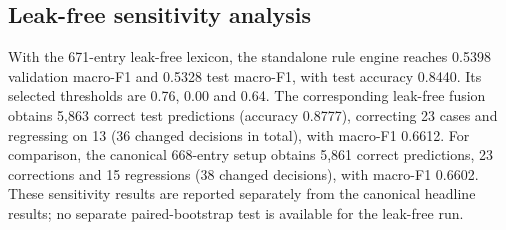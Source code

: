 \subsection{Leak-free sensitivity analysis}

\label{sec:leak-free-sensitivity}

With the 671-entry leak-free lexicon, the standalone rule engine reaches 0.5398
validation macro-F1 and 0.5328 test macro-F1, with test accuracy 0.8440. Its selected
thresholds are \hate{} 0.76, \off{} 0.00 and \clean{} 0.64. The corresponding
leak-free fusion obtains 5{,}863 correct test predictions (accuracy 0.8777),
correcting 23 cases and regressing on 13 (36 changed decisions in total), with
macro-F1 0.6612. For comparison, the canonical 668-entry setup obtains 5{,}861
correct predictions, 23 corrections and 15 regressions (38 changed decisions),
with macro-F1 0.6602. These sensitivity results are reported separately from the
canonical headline results; no separate paired-bootstrap test is available for the
leak-free run.